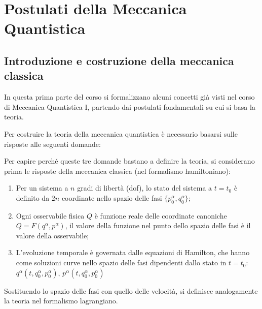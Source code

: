 \chapter{Postulati della Meccanica Quantistica}
\section{Introduzione e costruzione della meccanica classica}
In questa prima parte del corso si formalizzano alcuni concetti già visti
nel corso di Meccanica Quantistica I, partendo dai postulati fondamentali su cui si basa
la teoria.

Per costruire la teoria della meccanica quantistica è necessario basarsi sulle risposte
alle seguenti domande:

\noindent{}%

Per capire perché queste tre domande bastano a definire la teoria, si considerano prima
le risposte della meccanica classica (nel formalismo hamiltoniano):
\begin{enumerate}
    \item Per un sistema a $ n $ gradi di libertà (dof), lo stato del sistema a $ t=t_0 $
	è definito da $ 2n $ coordinate nello spazio delle fasi
	$ \{ p_0^{\alpha}, q_0^{\alpha} \} $;
    \item Ogni osservabile fisica $ Q $ è funzione reale delle coordinate canoniche
	$ Q = F(q^{\alpha}, p^{\alpha}) $, il valore della funzione nel punto dello
	spazio delle fasi è il valore della osservabile;
    \item L'evoluzione temporale è governata dalle equazioni di Hamilton, che hanno come
	soluzioni curve nello spazio delle fasi dipendenti dallo stato in $ t = t_0 $:
	$ q^{\alpha}(t,q_0^{\alpha},p_0^{\alpha})$, $p^{\alpha}(t,q_0^{\alpha},p_0^{\alpha})$ 
\end{enumerate}
Sostituendo lo spazio delle fasi con quello delle velocità, si definisce analogamente la
teoria nel formalismo lagrangiano.

